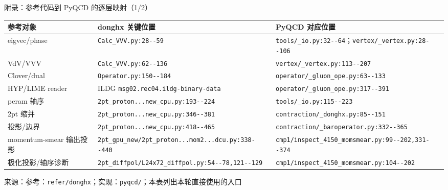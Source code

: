 \documentclass[UTF8,aspectratio=169,11pt]{ctexbeamer}
\newcommand{\source}[1]{\vspace{0.05em}\par{\raggedright\scriptsize\color{muted}来源：#1\par}}
\newcommand{\codepath}[1]{\nolinkurl{#1}}
\begin{document}
\appendix

\begin{frame}[t]{附录：参考代码到 PyQCD 的逐层映射（1/2）}
  \footnotesize
  \setlength{\tabcolsep}{3pt}
  \renewcommand{\arraystretch}{1.00}
  \begin{tabularx}{0.96\textwidth}{@{}L Y Y@{}}
    \toprule
    参考对象 & donghx 关键位置 & PyQCD 对应位置\\
    \midrule
    eigvec/phase & \codepath{Calc_VVV.py:28--59} & \codepath{tools/_io.py:32--64}；\codepath{vertex/_vertex.py:28--106}\\
    VdV/VVV & \codepath{Calc_VVV.py:62--136} & \codepath{vertex/_vertex.py:113--207}\\
    Clover/dual & \codepath{Operator.py:150--184} & \codepath{operator/_gluon_ope.py:63--133}\\
    HYP/LIME reader & ILDG \codepath{msg02.rec04.ildg-binary-data} & \codepath{operator/_gluon_ope.py:317--391}\\
    peram 轴序 & \codepath{2pt_proton...new_cpu.py:193--224} & \codepath{tools/_io.py:115--223}\\
    2pt 缩并 & \codepath{2pt_proton...new_cpu.py:346--381} & \codepath{contraction/_donghx.py:85--151}\\
    投影/边界 & \codepath{2pt_proton...new_cpu.py:418--465} & \codepath{contraction/_baroperator.py:332--365}\\
    momentum-smear 输出投影 & \codepath{2pt_gpu_new/2pt_proton...mom2...dcu.py:338--440} & \codepath{cmp1/inspect_4150_momsmear.py:99--202,331--374}\\
    极化投影/轴序诊断 & \codepath{2pt_diffpol/L24x72_diffpol.py:54--78,121--129} & \codepath{cmp1/inspect_4150_momsmear.py:104--202}\\
    \bottomrule
  \end{tabularx}
  \source{参考：\codepath{refer/donghx}；实现：\codepath{pyqcd/}；本表列出本轮直接使用的入口}
\end{frame}
\end{document}
